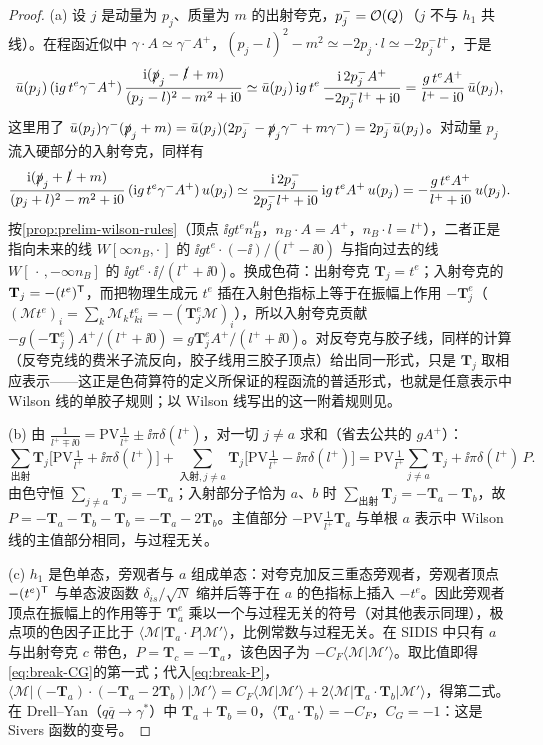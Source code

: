 \begin{proof}
(a) 设 $j$ 是动量为 $p_j$、质量为 $m$ 的出射夸克，$p_j^-=\mathcal{O}\!\left(Q\right)$（$j$ 不与 $h_1$ 共线）。在程函近似中 $\gamma\cdot A\simeq\gamma^-A^+$，$(p_j-l)^2-m^2\simeq-2p_j\cdot l\simeq-2p_j^-l^+$，于是
\[
\bar u(p_j)\,(\mathrm{i} g\,t^e\gamma^-A^+)\,\frac{\mathrm{i}(\slashed{p}_j-\slashed{l}+m)}{(p_j-l)^2-m^2+\mathrm{i}0}\simeq
\bar u(p_j)\,\mathrm{i} g\,t^e\,\frac{\mathrm{i}\,2p_j^-A^+}{-2p_j^-l^++\mathrm{i}0}=\frac{g\,t^e A^+}{l^+-\mathrm{i}0}\,\bar u(p_j),
\]
这里用了 $\bar u(p_j)\gamma^-(\slashed{p}_j+m)=\bar u(p_j)(2p_j^--\slashed{p}_j\gamma^-+m\gamma^-)=2p_j^-\bar u(p_j)$。对动量 $p_j$ 流入硬部分的入射夸克，同样有
\[
\frac{\mathrm{i}(\slashed{p}_j+\slashed{l}+m)}{(p_j+l)^2-m^2+\mathrm{i}0}\,(\mathrm{i} g\,t^e\gamma^-A^+)\,u(p_j)\simeq\frac{\mathrm{i}\,2p_j^-}{2p_j^-l^++\mathrm{i}0}\,\mathrm{i} g\,t^eA^+\,u(p_j)=-\frac{g\,t^eA^+}{l^++\mathrm{i}0}\,u(p_j).
\]
按\cref{prop:prelim-wilson-rules}（顶点 $\ii gt^en_B^\mu$，$n_B\cdot A=A^+$，$n_B\cdot l=l^+$），二者正是指向未来的线 $W[\infty n_B,\cdot\,]$ 的 $\ii gt^e\cdot(-\ii)/(l^+-\ii0)$ 与指向过去的线 $W[\,\cdot\,,-\infty n_B]$ 的 $\ii gt^e\cdot\ii/(l^++\ii0)$。换成色荷：出射夸克 $\mathbf T_j=t^e$；入射夸克的 $\mathbf T_j=-(t^e)^{\mathsf{T}}$，而把物理生成元 $t^e$ 插在入射色指标上等于在振幅上作用 $-\mathbf T_j^e$（$(\mathcal Mt^e)_i=\sum_k\mathcal M_kt^e_{ki}=-(\mathbf T_j^e\mathcal M)_i$），所以入射夸克贡献 $-g(-\mathbf T_j^e)A^+/(l^++\ii0)=g\mathbf T_j^eA^+/(l^++\ii0)$。对反夸克与胶子线，同样的计算（反夸克线的费米子流反向，胶子线用三胶子顶点）给出同一形式，只是 $\mathbf T_j$ 取相应表示——这正是色荷算符的定义所保证的程函流的普适形式\cite{CataniSeymour1997}，也就是任意表示中 Wilson 线的单胶子规则；以 Wilson 线写出的这一附着规则见\cite{Buffing:2011mj}。

(b) 由 $\frac{1}{l^+\mp\ii0}=\mathrm{PV}\frac1{l^+}\pm\ii\pi\delta(l^+)$，对一切 $j\neq a$ 求和（省去公共的 $gA^+$）：
\[
\sum_{\text{出射}}\mathbf T_j\Big[\mathrm{PV}\tfrac1{l^+}+\ii\pi\delta(l^+)\Big]+\sum_{\text{入射},j\neq a}\mathbf T_j\Big[\mathrm{PV}\tfrac1{l^+}-\ii\pi\delta(l^+)\Big]
=\mathrm{PV}\tfrac1{l^+}\sum_{j\neq a}\mathbf T_j+\ii\pi\delta(l^+)\,P .
\]
由色守恒 $\sum_{j\neq a}\mathbf T_j=-\mathbf T_a$；入射部分子恰为 $a$、$b$ 时 $\sum_{\text{出射}}\mathbf T_j=-\mathbf T_a-\mathbf T_b$，故 $P=-\mathbf T_a-\mathbf T_b-\mathbf T_b=-\mathbf T_a-2\mathbf T_b$。主值部分 $-\mathrm{PV}\frac1{l^+}\mathbf T_a$ 与单根 $a$ 表示中 Wilson 线的主值部分相同，与过程无关。

(c) $h_1$ 是色单态，旁观者与 $a$ 组成单态：对夸克加反三重态旁观者，旁观者顶点 $-(t^e)^{\mathsf{T}}$ 与单态波函数 $\delta_{is}/\sqrt N$ 缩并后等于在 $a$ 的色指标上插入 $-t^e$。因此旁观者顶点在振幅上的作用等于 $\mathbf T_a^e$ 乘以一个与过程无关的符号（对其他表示同理），极点项的色因子正比于 $\langle\mathcal M|\mathbf T_a\cdot P|\mathcal M'\rangle$，比例常数与过程无关。在 SIDIS 中只有 $a$ 与出射夸克 $c$ 带色，$P=\mathbf T_c=-\mathbf T_a$，该色因子为 $-C_F\langle\mathcal M|\mathcal M'\rangle$。取比值即得\cref{eq:break-CG}的第一式；代入\cref{eq:break-P}，$\langle\mathcal M|(-\mathbf T_a)\cdot(-\mathbf T_a-2\mathbf T_b)|\mathcal M'\rangle=C_F\langle\mathcal M|\mathcal M'\rangle+2\langle\mathcal M|\mathbf T_a\cdot\mathbf T_b|\mathcal M'\rangle$，得第二式。在 Drell--Yan（$q\bar q\to\gamma^*$）中 $\mathbf T_a+\mathbf T_b=0$，$\langle\mathbf T_a\cdot\mathbf T_b\rangle=-C_F$，$C_G=-1$：这是 Sivers 函数的变号。


\end{proof}
